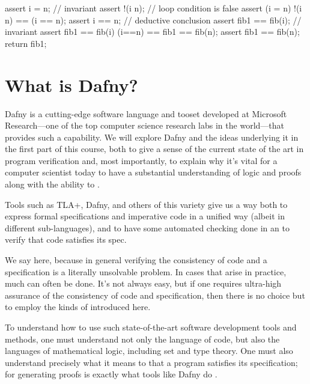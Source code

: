 \documentclass[letterpaper,10pt,english]{sphinxmanual}
\begin{document}
\begin{sphinxVerbatim}[commandchars=\\\{\}]
assert i \PYGZlt{}= n;      // invariant
assert !(i \PYGZlt{} n);    // loop condition is false
assert (i \PYGZlt{}= n) \PYGZam{}\PYGZam{} !(i \PYGZlt{} n) ==\PYGZgt{} (i == n);
assert i == n;      // deductive conclusion
assert fib1 == fib(i); // invariant
assert fib1 == fib(i) \PYGZam{}\PYGZam{} (i==n) ==\PYGZgt{} fib1 == fib(n);
assert fib1 == fib(n);
return fib1;
\end{sphinxVerbatim}


\section{What is Dafny?}
\label{\detokenize{05-putting-it-together:what-is-dafny}}
Dafny is a cutting-edge software language and tooset developed at
Microsoft Research—one of the top computer science research labs in
the world—that provides such a capability. We will explore Dafny and
the ideas underlying it in the first part of this course, both to give
a sense of the current state of the art in program verification and,
most importantly, to explain why it’s vital for a computer scientist
today to have a substantial understanding of logic and proofs along
with the ability to .

Tools such as TLA+, Dafny, and others of this variety give us a way
both to express formal specifications and imperative code in a unified
way (albeit in different sub-languages), and to have some automated
checking done in an  to verify that code satisfies its spec.

We say  here, because in general verifying the consistency of
code and a specification is a literally unsolvable problem. In cases
that arise in practice, much can often be done. It’s not always easy,
but if one requires ultra-high assurance of the consistency of code
and specification, then there is no choice but to employ the kinds of
 introduced here.

To understand how to use such state-of-the-art software development
tools and methods, one must understand not only the language of code,
but also the languages of mathematical logic, including set and type
theory. One must also understand precisely what it means to 
that a program satisfies its specification; for generating proofs is
exactly what tools like Dafny do .
\end{document}
